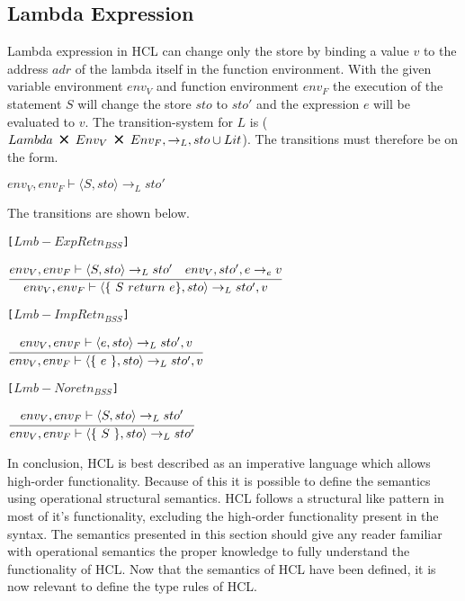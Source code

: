 \subsection{Lambda Expression}
Lambda expression in HCL can change only the store by binding a value $v$ to the address $adr$ of the lambda itself in the function environment.
With the given variable environment $env_V$ and function environment $env_F$ the execution of the statement $S$ will change the store $sto$ to $sto'$ and the expression $e$ will be evaluated to $v$.
The transition-system for $L$ is ($Lambda\ \Cross\ Env_V\ \Cross\ Env_F, \rightarrow_L, sto \cup Lit$).
The transitions must therefore be on the form.
\begin{center}
	$env_V, env_F \vdash \langle S, sto \rangle \rightarrow_L sto'$
\end{center}

The transitions are shown below.

\texttt{[$Lmb-ExpRetn_{BSS}$]}
\begin{center}
	\begin{math}
		\cfrac
			{env_V, env_F \vdash \langle S, sto \rangle \rightarrow_L sto' \quad env_V, sto', e \rightarrow_e v}
			{env_V, env_F \vdash \langle \{\ S\ return\ e \}, sto \rangle \rightarrow_L sto', v}
	\end{math}
\end{center}

\texttt{[$Lmb-ImpRetn_{BSS}$]}
\begin{center}
	\begin{math}
	\cfrac
	{env_V, env_F \vdash \langle e, sto \rangle \rightarrow_L sto', v}
	{env_V, env_F \vdash \langle \{\ e\ \}, sto \rangle \rightarrow_L sto', v}
	\end{math}
\end{center}

\texttt{[$Lmb-Noretn_{BSS}$]}
\begin{center}
	\begin{math}
		\cfrac
			{env_V, env_F \vdash \langle S, sto \rangle \rightarrow_L sto'}
			{env_V, env_F \vdash \langle \{\ S\ \}, sto \rangle \rightarrow_L sto'}
	\end{math}
\end{center}

In conclusion, HCL is best described as an imperative language which allows high-order functionality. 
Because of this it is possible to define the semantics using operational structural semantics.
HCL follows a structural like pattern in most of it's functionality, excluding the high-order functionality present in the syntax.
The semantics presented in this section should give any reader familiar with operational semantics the proper knowledge to fully understand the functionality of HCL.
Now that the semantics of HCL have been defined, it is now relevant to define the type rules of HCL.
